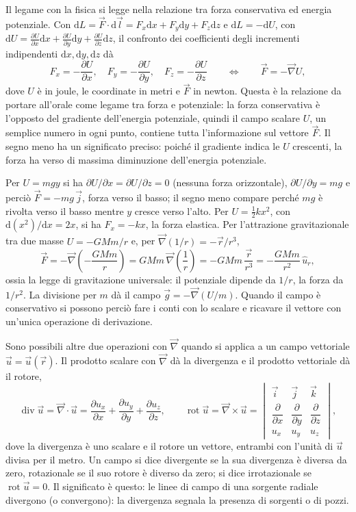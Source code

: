 \documentclass[11pt,a4paper]{article}
\newcommand{\nab}{\vec{\nabla}}
\newcommand{\dd}{\mathrm{d}}
\DeclareMathOperator{\Div}{div}
\DeclareMathOperator{\rot}{rot}
\begin{document}
Il legame con la fisica si legge nella relazione tra forza conservativa ed energia potenziale. Con $\dd L=\vec F\cdot\dd\vec l=F_x\dd x+F_y\dd y+F_z\dd z$ e $\dd L=-\dd U$, con $\dd U=\frac{\partial U}{\partial x}\dd x+\frac{\partial U}{\partial y}\dd y+\frac{\partial U}{\partial z}\dd z$, il confronto dei coefficienti degli incrementi indipendenti $\dd x,\dd y,\dd z$ dà
\[
F_x=-\frac{\partial U}{\partial x},\quad F_y=-\frac{\partial U}{\partial y},\quad F_z=-\frac{\partial U}{\partial z}\qquad\Longleftrightarrow\qquad \vec F=-\nab U ,
\]
dove $U$ è in joule, le coordinate in metri e $\vec F$ in newton. Questa è la relazione da portare all'orale come legame tra forza e potenziale: la forza conservativa è l'opposto del gradiente dell'energia potenziale, quindi il campo scalare $U$, un semplice numero in ogni punto, contiene tutta l'informazione sul vettore $\vec F$. Il segno meno ha un significato preciso: poiché il gradiente indica le $U$ crescenti, la forza ha verso di massima diminuzione dell'energia potenziale. 

Per $U=mgy$ si ha $\partial U/\partial x=\partial U/\partial z=0$ (nessuna forza orizzontale), $\partial U/\partial y=mg$ e perciò $\vec F=-mg\,\vec j$, forza verso il basso; il segno meno compare perché $mg$ è rivolta verso il basso mentre $y$ cresce verso l'alto. Per $U=\tfrac12kx^2$, con $\dd(x^2)/\dd x=2x$, si ha $F_x=-kx$, la forza elastica. Per l'attrazione gravitazionale tra due masse $U=-GMm/r$ e, per $\nab(1/r)=-\vec r/r^3$,
\[
\vec F=-\nab\!\left(-\frac{GMm}{r}\right)=GMm\,\nab\!\left(\frac1r\right)=-GMm\,\frac{\vec r}{r^3}=-\frac{GMm}{r^2}\,\hat u_r ,
\]
ossia la legge di gravitazione universale: il potenziale dipende da $1/r$, la forza da $1/r^2$. La divisione per $m$ dà il campo $\vec g=-\nab(U/m)$. Quando il campo è conservativo si possono perciò fare i conti con lo scalare e ricavare il vettore con un'unica operazione di derivazione.

Sono possibili altre due operazioni con $\nab$ quando si applica a un campo vettoriale $\vec u=\vec u(\vec r)$. Il prodotto scalare con $\nab$ dà la divergenza e il prodotto vettoriale dà il rotore,
\[
\Div\vec u=\nab\cdot\vec u=\frac{\partial u_x}{\partial x}+\frac{\partial u_y}{\partial y}+\frac{\partial u_z}{\partial z},\qquad
\rot\vec u=\nab\times\vec u=\begin{vmatrix}\vec i&\vec j&\vec k\\[2pt]\dfrac{\partial}{\partial x}&\dfrac{\partial}{\partial y}&\dfrac{\partial}{\partial z}\\[4pt]u_x&u_y&u_z\end{vmatrix},
\]
dove la divergenza è uno scalare e il rotore un vettore, entrambi con l'unità di $\vec u$ divisa per il metro. Un campo si dice divergente se la sua divergenza è diversa da zero, rotazionale se il suo rotore è diverso da zero; si dice irrotazionale se $\rot\vec u=0$. Il significato è questo: le linee di campo di una sorgente radiale divergono (o convergono): la divergenza segnala la presenza di sorgenti o di pozzi. 
\end{document}
